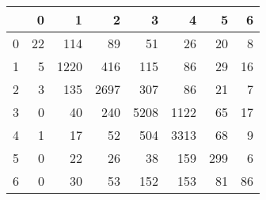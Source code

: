 \begin{table}[ht]
\centering
\begin{tabular}{rrrrrrrr}
  \hline
 & 0 & 1 & 2 & 3 & 4 & 5 & 6 \\ 
  \hline
0 &  22 & 114 &  89 &  51 &  26 &  20 &   8 \\ 
  1 &   5 & 1220 & 416 & 115 &  86 &  29 &  16 \\ 
  2 &   3 & 135 & 2697 & 307 &  86 &  21 &   7 \\ 
  3 &   0 &  40 & 240 & 5208 & 1122 &  65 &  17 \\ 
  4 &   1 &  17 &  52 & 504 & 3313 &  68 &   9 \\ 
  5 &   0 &  22 &  26 &  38 & 159 & 299 &   6 \\ 
  6 &   0 &  30 &  53 & 152 & 153 &  81 &  86 \\ 
   \hline
\end{tabular}
\end{table}
